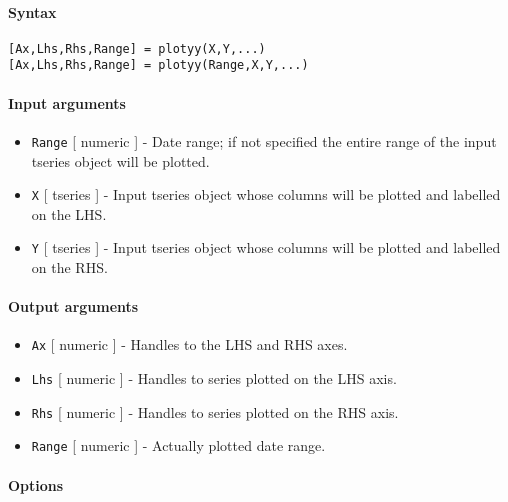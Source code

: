 


	\paragraph{Syntax}\label{syntax}

\begin{verbatim}
[Ax,Lhs,Rhs,Range] = plotyy(X,Y,...)
[Ax,Lhs,Rhs,Range] = plotyy(Range,X,Y,...)
\end{verbatim}

\paragraph{Input arguments}\label{input-arguments}

\begin{itemize}
\item
  \texttt{Range} {[} numeric {]} - Date range; if not specified the
  entire range of the input tseries object will be plotted.
\item
  \texttt{X} {[} tseries {]} - Input tseries object whose columns will
  be plotted and labelled on the LHS.
\item
  \texttt{Y} {[} tseries {]} - Input tseries object whose columns will
  be plotted and labelled on the RHS.
\end{itemize}

\paragraph{Output arguments}\label{output-arguments}

\begin{itemize}
\item
  \texttt{Ax} {[} numeric {]} - Handles to the LHS and RHS axes.
\item
  \texttt{Lhs} {[} numeric {]} - Handles to series plotted on the LHS
  axis.
\item
  \texttt{Rhs} {[} numeric {]} - Handles to series plotted on the RHS
  axis.
\item
  \texttt{Range} {[} numeric {]} - Actually plotted date range.
\end{itemize}

\paragraph{Options}\label{options}


